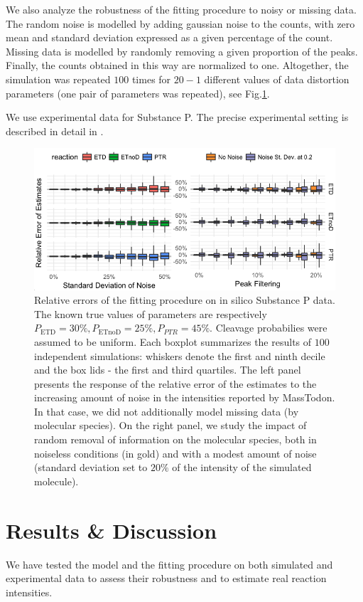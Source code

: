 \documentclass{llncs}
\begin{document}
We also analyze the robustness of the fitting procedure to noisy or missing data. The random noise is modelled by adding gaussian noise to the counts, with zero mean and standard deviation expressed as a given percentage of the count. Missing data is modelled by randomly removing a given proportion of the peaks. Finally, the counts obtained in this way are normalized to one. Altogether, the simulation was repeated $100$ times for $20-1$ different values of data distortion parameters (one pair of parameters was repeated), see Fig.\ref{fig::kokos}.

We use experimental data for Substance P. The precise experimental setting is described in detail in \cite{Lermyte2015-eb}.
\begin{figure}[h]
        \center
        \includegraphics[width=\textwidth]{kokos.png}
        \caption{ Relative errors of the fitting procedure on in silico Substance P data. The known true values of parameters are respectively $P_\text{ETD}=30\%, P_\text{ETnoD}= 25\%, P_{PTR}= 45\%$. Cleavage probabilies were assumed to be uniform. Each boxplot summarizes the results of $100$ independent simulations: whiskers denote the first and ninth decile and the box lids - the first and third quartiles. The left panel presents the response of the relative error of the estimates to the increasing amount of noise in the intensities reported by {\sc MassTodon}. In that case, we did not additionally model missing data (by molecular species). On the right panel, we study the impact of random removal of information on the molecular species, both in noiseless conditions (in gold) and with a modest amount of noise (standard deviation set to $20\%$ of the intensity of the simulated molecule).
        }\label{fig::kokos}
\end{figure}
\section{Results \& Discussion}
We have tested the model and the fitting procedure on both simulated and experimental data to assess their robustness and to estimate real reaction intensities.
\end{document}
